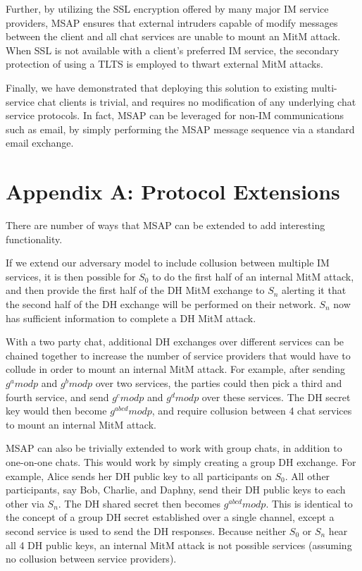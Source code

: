 \documentclass[twoside,10pt]{article}
\begin{document}
\begin{multicols}{2}
Further, by utilizing the SSL encryption offered by many major IM service providers, MSAP ensures that external intruders capable of modify messages between the client and all chat services are unable to mount an MitM attack.  When SSL is not available with a client's preferred IM service, the secondary protection of using a TLTS is employed to thwart external MitM attacks.

Finally, we have demonstrated that deploying this solution to existing multi-service chat clients is trivial, and requires no modification of any underlying chat service protocols.  In fact, MSAP can be leveraged for non-IM communications such as email, by simply performing the MSAP message sequence via a standard email exchange.

\section{Appendix A: Protocol Extensions}
There are number of ways that MSAP can be extended to add interesting functionality.  

If we extend our adversary model to include collusion between multiple IM services, it is then possible for $S_0$ to do the first half of an internal MitM attack, and then provide the first half of the DH MitM exchange to $S_n$ alerting it that the second half of the DH exchange will be performed on their network.  $S_n$ now has sufficient information to complete a DH MitM attack.

With a two party chat, additional DH exchanges over different services can be chained together to increase the number of service providers that would have to collude in order to mount an internal MitM attack.  For example, after sending $g^a mod p$ and $g^b mod p$ over two services, the parties could then pick a third and fourth service, and send $g^c mod p$ and $g^d mod p$ over these services.  The DH secret key would then become $g^{abcd} mod p$, and require collusion between 4 chat services to mount an internal MitM attack.


MSAP can also be trivially extended to work with group chats, in addition to one-on-one chats.  This would work by simply creating a group DH exchange.  For example, Alice sends her DH public key to all participants on $S_0$.  All other participants, say Bob, Charlie, and Daphny, send their DH public keys to each other via $S_n$.  The DH shared secret then becomes $g^{abcd} mod p$.  This is identical to the concept of a group DH secret established over a single channel, except a second service is used to send the DH responses.  Because neither $S_0$ or $S_n$ hear all 4 DH public keys, an internal MitM attack is not possible services (assuming no collusion between service providers).


\end{multicols}
\end{document}
